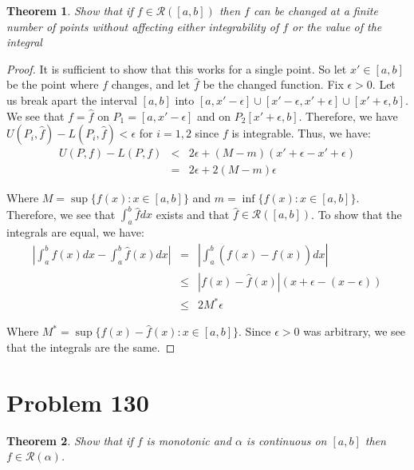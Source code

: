 \documentclass[psamsfonts]{amsart}
\newtheorem{thm}{Theorem}[section]
\theoremstyle{definition}
\theoremstyle{remark}
\numberwithin{equation}{section}
\begin{document}
\begin{thm}
Show that if $f \in \mathscr{R}([a,b])$ then $f$ can be changed at a finite number of points without affecting either integrability of $f$ or the value of the integral
\end{thm}

\begin{proof}
It is sufficient to show that this works for a single point. So let $x' \in [a,b]$ be the point where $f$ changes, and let $\hat{f}$ be the changed function. Fix $\epsilon > 0$. Let us break apart the interval $[a,b]$ into $[a,x' - \epsilon] \cup [x' - \epsilon, x' + \epsilon] \cup [x' + \epsilon, b]$. We see that $f = \hat{f}$ on $P_1 = [a,x' - \epsilon]$ and on $P_2 [x' + \epsilon, b]$. Therefore, we have $U(P_i,\hat{f}) - L(P_i,\hat{f}) < \epsilon$ for $i = 1,2$ since $f$ is integrable. Thus, we have:
\begin{eqnarray}
U(P,f) - L(P,f) &<& 2 \epsilon + (M - m) (x' + \epsilon - x' + \epsilon) \\
& =& 2 \epsilon + 2 (M-m) \epsilon
\end{eqnarray}

Where $M = \sup \{ f(x) : x \in [a,b] \}$ and $m = \inf \{ f(x) : x \in [a,b] \}$. Therefore, we see that $\int_a^b \hat{f} dx$ exists and that $\hat{f} \in \mathscr{R}([a,b])$. To show that the integrals are equal, we have:
\begin{eqnarray}
\left| \int_a^b f(x) dx - \int_a^b \hat{f}(x) dx \right| &=& \left| \int_a^b (f(x) - \hat{f}(x)) dx \right| \\
&\leq& |f(x) - \hat{f}(x)| ( x + \epsilon - (x - \epsilon)) \\
&\leq& 2 M^{*} \epsilon
\end{eqnarray}

Where $M^{*} = \sup \{ f(x) - \hat{f}(x) : x \in [a,b] \}$. Since $\epsilon > 0$ was arbitrary, we see that the integrals are the same.
\end{proof} 

\section{Problem 130}

\begin{thm}
Show that if $f$ is monotonic and $\alpha$ is continuous on $[a,b]$ then $f \in \mathscr{R}(\alpha)$. 
\end{thm}
\end{document}
